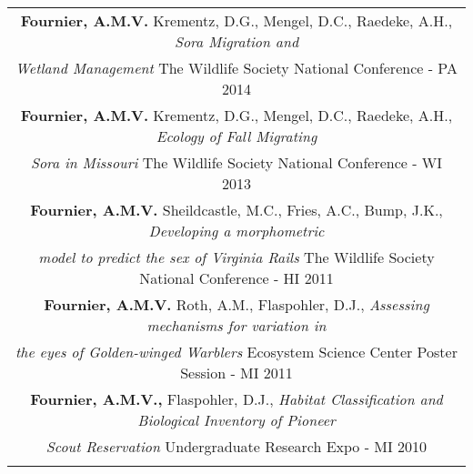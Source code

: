 \documentclass[letterpaper,11pt]{article}
\begin{document}
	\begin{center}\begin{tabular*}{6.9in}{l@{\extracolsep{\fill}}r}
	
\multicolumn{2}{c}{{\bf Fournier, A.M.V.} Krementz, D.G., Mengel, D.C., Raedeke, A.H., {\it Sora Migration and } \hfill \cftdotfill{\cftdotsep}}\\
\multicolumn{2}{c}{{\it Wetland Management} {The Wildlife Society National Conference - PA}
\cftdotfill{\cftdotsep}2014}\\

\multicolumn{2}{c}{{\bf Fournier, A.M.V.} Krementz, D.G., Mengel, D.C., Raedeke, A.H., {\it Ecology of Fall Migrating } \hfill \cftdotfill{\cftdotsep}}\\
\multicolumn{2}{c}{{\it Sora in Missouri} {The Wildlife Society National Conference - WI}
\cftdotfill{\cftdotsep}2013}\\

\multicolumn{2}{c}{{\bf Fournier, A.M.V.} Sheildcastle, M.C., Fries, A.C., Bump, J.K., {\it Developing a morphometric} \hfill \cftdotfill{\cftdotsep}}\\
\multicolumn{2}{c}{{\it model to predict the sex of Virginia Rails} {The Wildlife Society National Conference - HI}
\cftdotfill{\cftdotsep}2011}\\


\multicolumn{2}{c}{{\bf Fournier, A.M.V.} Roth, A.M., Flaspohler, D.J., {\it Assessing mechanisms for variation in} \hfill \cftdotfill{\cftdotsep}}\\
\multicolumn{2}{c}{{\it the eyes of Golden-winged Warblers} {Ecosystem Science Center Poster Session - MI }\cftdotfill{\cftdotsep} 2011}\\

\multicolumn{2}{c}{{\bf Fournier, A.M.V.,} Flaspohler, D.J., {\it Habitat Classification and Biological Inventory of Pioneer \hfill} \cftdotfill{\cftdotsep}}\\
\multicolumn{2}{c}{{\it Scout Reservation} {Undergraduate Research Expo - MI  }\cftdotfill{\cftdotsep} 2010}\\

\vphantom{E}
\end{tabular*}
\end{center}\vspace*{-16pt}
\end{document}

